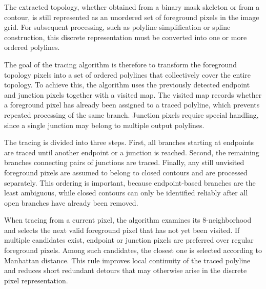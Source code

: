 The extracted topology, whether obtained from a binary mask skeleton or from a contour, is still represented as an unordered set of foreground pixels in the image grid. For subsequent processing, such as polyline simplification or spline construction, this discrete representation must be converted into one or more ordered polylines.

The goal of the tracing algorithm is therefore to transform the foreground topology pixels into a set of ordered polylines that collectively cover the entire topology. To achieve this, the algorithm uses the previously detected endpoint and junction pixels together with a visited map. The visited map records whether a foreground pixel has already been assigned to a traced polyline, which prevents repeated processing of the same branch. Junction pixels require special handling, since a single junction may belong to multiple output polylines.

The tracing is divided into three steps. First, all branches starting at endpoints are traced until another endpoint or a junction is reached. Second, the remaining branches connecting pairs of junctions are traced. Finally, any still unvisited foreground pixels are assumed to belong to closed contours and are processed separately. This ordering is important, because endpoint-based branches are the least ambiguous, while closed contours can only be identified reliably after all open branches have already been removed.

When tracing from a current pixel, the algorithm examines its 8-neighborhood and selects the next valid foreground pixel that has not yet been visited. If multiple candidates exist, endpoint or junction pixels are preferred over regular foreground pixels. Among such candidates, the closest one is selected according to Manhattan distance. This rule improves local continuity of the traced polyline and reduces short redundant detours that may otherwise arise in the discrete pixel representation.


